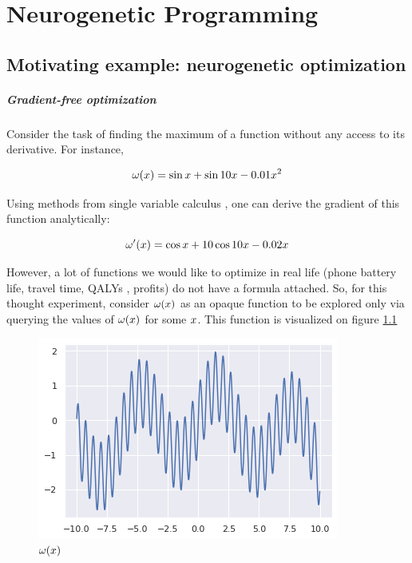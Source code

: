 \chapter{Neurogenetic Programming}\label{ch:neurogen}

\section{Motivating example: neurogenetic optimization}

\paragraph{Gradient-free optimization}

Consider the task of finding the maximum of a function without any access to its derivative. For instance,

\begin{equation}
\omega(x) = \sin x + \sin 10 x - 0.01 x^2
\end{equation}

Using methods from single variable calculus \cite{antonCalculusSingleVariable2021}, one can derive the gradient of this function analytically:

\begin{equation}
\omega'(x) = \cos x + 10 \cos 10 x - 0.02 x
\end{equation}

However, a lot of functions we would like to optimize in real life (phone battery life, travel time, QALYs \cite{ryenWillingnessPayfitness2015, torranceUtilitiesfitnessadjustedLife1989}, profits) do not have a formula attached. 
So, for this thought experiment, consider $ \omega(x) $ as an opaque function to be explored only via querying the values of $ \omega(x) $ for some $x$.
This function is visualized on figure \ref{fig:neuropt-f}
    
\begin{figure}
    \centering
    \includegraphics[width=0.8\linewidth]{images/neuropt1.png}
    \caption{$\omega(x)$}
    \label{fig:neuropt-f}
\end{figure}

